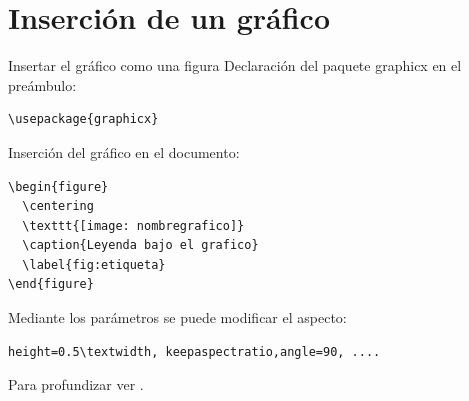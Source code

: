 \documentclass{beamer}
\begin{document}
\section{Inserci\'on de un gr\'afico}
\begin{frame}[fragile]{Insertar el gr\'afico como una figura}
Declaraci\'on del paquete graphicx en el pre\'ambulo:
\begin{verbatim}\usepackage{graphicx} \end{verbatim}

Inserci\'on del gr\'afico en el documento:
\begin{verbatim}
\begin{figure}
  \centering
  \texttt{[image: nombregrafico]}
  \caption{Leyenda bajo el grafico}
  \label{fig:etiqueta}
\end{figure}
\end{verbatim}
Mediante los par\'ametros se puede modificar el aspecto:\\
\begin{verbatim}height=0.5\textwidth, keepaspectratio,angle=90, ....\end{verbatim}
Para profundizar ver \cite{ManualImportingGraphics,ManualLatexWikilibros} .
\end{frame}
\end{document}
